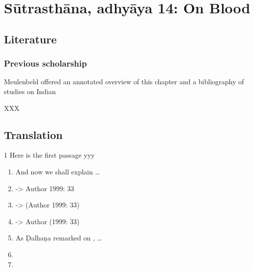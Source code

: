 
\section{Sūtrasthāna, adhyāya 14:  On Blood}


\subsection{Literature} 

\subsubsection{Previous scholarship}

Meulenbeld offered an annotated overview of this chapter and a bibliography
of studies on Indian 



XXX

\subsection{Translation}

\begin{translation}    
    \item [1] Here is the first passage yyy
    
    \begin{enumerate}
        
        \item 
        And now we shall explain \ldots {}
        
        \item 
        
        \cite[33]{adri-1984} -> Author 1999: 33
        \item     
        \citep[33]{adri-1984} -> (Author 1999: 33)
        \item     
        \citet[33]{adri-1984} -> Author (1999: 33) 
        \item 
        As Ḍalhaṇa remarked on , \ldots  %
        \item \SS
        \item \CS
    \end{enumerate}
    
    
\end{translation}

